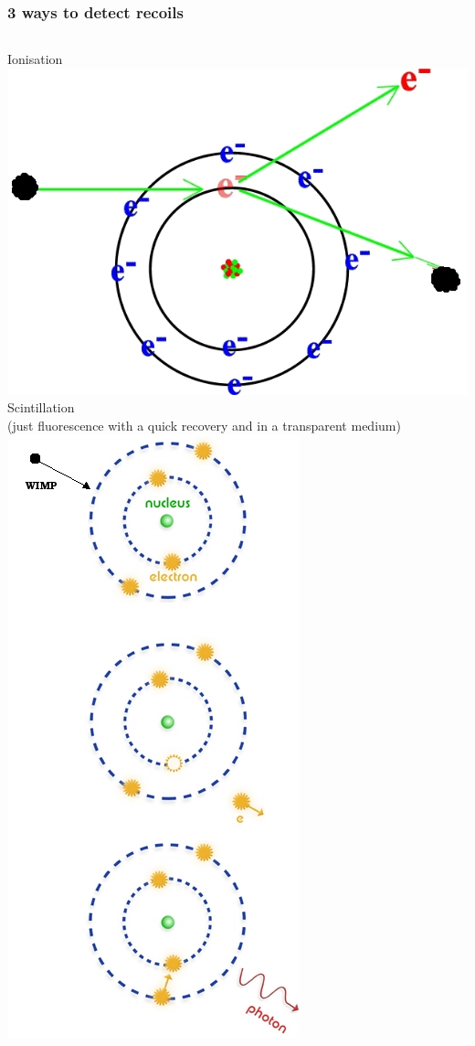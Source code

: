 \documentclass[xcolor=dvipsnames]{beamer}
\begin{document}
\begin{frame}
	\frametitle{3 ways to detect recoils}
	\begin{columns}[T]
		Ionisation\\	
		\vspace{2cm}	
		\includegraphics[width=0.8\linewidth]{Ionisation}
		Scintillation\\\tiny(just fluorescence with a quick recovery and in a transparent medium)\\
		\includegraphics[height=0.7\textheight]{Scintillation}		

\end{columns}
\end{frame}
\end{document}

